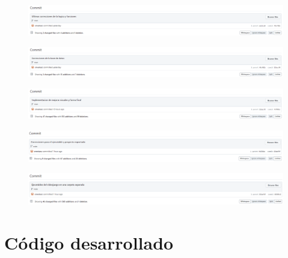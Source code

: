 \documentclass{article}
\begin{document}
\begin{figure}[H]
	\centering
	\includegraphics[width=1\textwidth,keepaspectratio]{img/commit_28.png}
\end{figure}
\begin{figure}[H]
	\centering
	\includegraphics[width=1\textwidth,keepaspectratio]{img/commit_29.png}
\end{figure}
\begin{figure}[H]
	\centering
	\includegraphics[width=1\textwidth,keepaspectratio]{img/commit_30.png}
\end{figure}
\begin{figure}[H]
	\centering
	\includegraphics[width=1\textwidth,keepaspectratio]{img/commit_31.png}
\end{figure}
\begin{figure}[H]
	\centering
	\includegraphics[width=1\textwidth,keepaspectratio]{img/commit_32.png}
\end{figure}
\pagebreak

\section{Código desarrollado}
\end{document}
